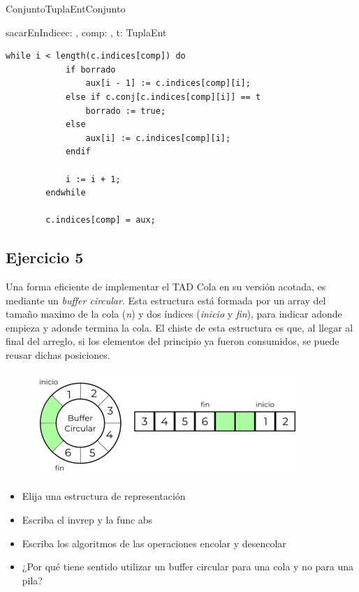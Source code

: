 \begin{module}{Conjunto}{TuplaEnt}{Conjunto}{\tupla{\ent,\ent,\ent}}
\begin{proc}{sacarEnIndice}{\Inout c: \moduletype, \In comp: \Int, \In t: TuplaEnt}{}
\begin{lstlisting}[numbers=none,frame=none]
		while i < length(c.indices[comp]) do
			if borrado
				aux[i - 1] := c.indices[comp][i];
			else if c.conj[c.indices[comp][i]] == t
				borrado := true;
			else
				aux[i] := c.indices[comp][i];
			endif

			i := i + 1;
		endwhile

		c.indices[comp] = aux;
		\end{lstlisting}
	\end{proc}
\end{module}

\subsection{Ejercicio 5}
Una forma eficiente de implementar el TAD Cola en su versión acotada, es mediante un \textit{buffer circular}. Esta estructura está formada por un array del tamaño maximo de la cola (\textit{n}) y dos índices (\textit{inicio} y \textit{fin}), para indicar adonde empieza y adonde termina la cola. El chiste de esta estructura es que, al llegar al final del arreglo, si los elementos del principio ya fueron consumidos, se puede reusar dichas posiciones.

\begin{figure}[h!]
	\includegraphics[width=10cm]{./buffer_circular.png}
\end{figure}

\begin{itemize}
	\item Elija una estructura de representación
	\item Escriba el invrep y la func abs
	\item Escriba los algoritmos de las operaciones encolar y desencolar
	\item ¿Por qué tiene sentido utilizar un buffer circular para una cola y no para una pila?
\end{itemize}

\pagebreak

